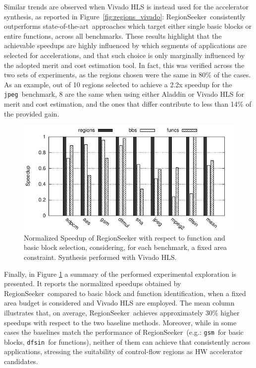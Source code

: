 \documentclass[]{usiinfthesis}
\newcommand{\rseeker}{{RegionSeeker}}
\newcommand{\SoTA}{{state-of-the-art}}
\newcommand{\jpeg}{\texttt{jpeg}}
\newcommand{\dfsin}{\texttt{dfsin}}
\newcommand{\gsm}{\texttt{gsm}}
\begin{document}
Similar trends are observed when Vivado HLS is instead used for the
accelerator synthesis, as reported in
Figure~\ref{fig:regions_vivado}: \rseeker\ consistently outperforms
\SoTA\ approaches which target either single basic blocks or
entire functions, across all benchmarks. These results 
highlight that the achievable speedups
are highly influenced by which segments of applications are selected
for accelerations, and that such choice is only marginally influenced
by the adopted merit and cost estimation tool. In fact, this was verified 
across the two sets of experiments, as the regions chosen were
the same in 80\% of the cases. As an example, out of 10 regions
selected to achieve a 2.2x speedup for the \jpeg\ benchmark, 8 are the
same when using either Aladdin or Vivado HLS for merit and cost
estimation, and the ones that differ contribute to less than 14\% of
the provided gain.\par


\begin{figure}[h!]
\centering
\includegraphics[width= 0.9 \linewidth]{figs/rbf_max_norm_all}
\caption{Normalized Speedup of RegionSeeker with respect to function and basic block selection, 
considering, for each benchmark, a fixed area constraint. Synthesis performed with Vivado HLS.}
\label{fig:regions_all}
\end{figure}

Finally, in Figure \ref{fig:regions_all} a summary of the performed experimental 
exploration is presented. It reports the normalized speedups
obtained by \rseeker\ compared to basic block and function
identification, when a fixed area budget is considered and
Vivado HLS are employed. The mean column illustrates that,
on average, \rseeker\ achieves approximately 30\% higher speedups
with respect to the two baseline methods. Moreover, while in some
cases the baselines match the performance of \rseeker\ (e.g.: \gsm\
for basic blocks, \dfsin\ for functions), neither of them can achieve that
consistently across applications, stressing the suitability of control-flow regions as
HW accelerator candidates.\par
\end{document}
